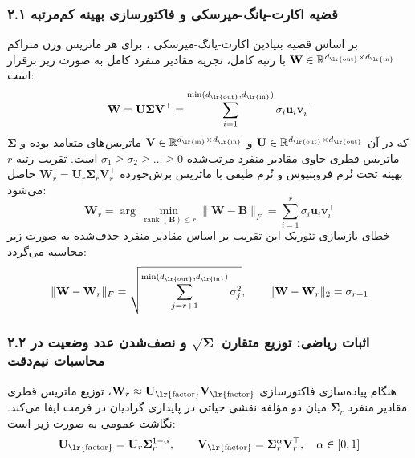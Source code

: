 \subsubsection*{۲.۱ قضیه اکارت-یانگ-میرسکی و فاکتورسازی بهینه کم‌مرتبه}
بر اساس قضیه بنیادین اکارت-یانگ-میرسکی ، برای هر ماتریس وزن متراکم $\mathbf{W} \in \mathbb{R}^{d_{\text{\lr{out}}} \times d_{\text{\lr{in}}}}$ با رتبه کامل، تجزیه مقادیر منفرد کامل به صورت زیر برقرار است:
\begin{equation}
\mathbf{W} = \mathbf{U} \mathbf{\Sigma} \mathbf{V}^\top = \sum_{i=1}^{\min(d_{\text{\lr{out}}}, d_{\text{\lr{in}}})} \sigma_i \mathbf{u}_i \mathbf{v}_i^\top
\end{equation}
که در آن $\mathbf{U} \in \mathbb{R}^{d_{\text{\lr{out}}} \times d_{\text{\lr{out}}}}$ و $\mathbf{V} \in \mathbb{R}^{d_{\text{\lr{in}}} \times d_{\text{\lr{in}}}}$ ماتریس‌های متعامد بوده و $\mathbf{\Sigma}$ ماتریس قطری حاوی مقادیر منفرد مرتب‌شده $\sigma_1 \ge \sigma_2 \ge \dots \ge 0$ است. تقریب رتبه-$r$ بهینه تحت نُرم فروبنیوس و نُرم طیفی  با ماتریس برش‌خورده $\mathbf{W}_r = \mathbf{U}_r \mathbf{\Sigma}_r \mathbf{V}_r^\top$ حاصل می‌شود:
\begin{equation}
\mathbf{W}_r = \arg\min_{\operatorname{rank}(\mathbf{B}) \le r} \|\mathbf{W} - \mathbf{B}\|_F = \sum_{i=1}^r \sigma_i \mathbf{u}_i \mathbf{v}_i^\top
\end{equation}
خطای بازسازی تئوریک این تقریب بر اساس مقادیر منفرد حذف‌شده به صورت زیر محاسبه می‌گردد:
\begin{equation}
\|\mathbf{W} - \mathbf{W}_r\|_F = \sqrt{\sum_{j=r+1}^{\min(d_{\text{\lr{out}}}, d_{\text{\lr{in}}})} \sigma_j^2}, \qquad \|\mathbf{W} - \mathbf{W}_r\|_2 = \sigma_{r+1}
\end{equation}

\subsubsection*{۲.۲ اثبات ریاضی: توزیع متقارن $\sqrt{\mathbf{\Sigma}}$ و نصف‌شدن عدد وضعیت در محاسبات نیم‌دقت }
هنگام پیاده‌سازی فاکتورسازی $\mathbf{W}_r \approx \mathbf{U}_{\text{\lr{factor}}} \mathbf{V}_{\text{\lr{factor}}}$، توزیع ماتریس قطری مقادیر منفرد $\mathbf{\Sigma}_r$ میان دو مؤلفه نقشی حیاتی در پایداری گرادیان در فرمت  ایفا می‌کند. نگاشت عمومی به صورت زیر است:
\begin{equation}
\mathbf{U}_{\text{\lr{factor}}} = \mathbf{U}_r \mathbf{\Sigma}_r^{1-\alpha}, \qquad \mathbf{V}_{\text{\lr{factor}}} = \mathbf{\Sigma}_r^\alpha \mathbf{V}_r^\top, \quad \alpha \in [0, 1]
\end{equation}

